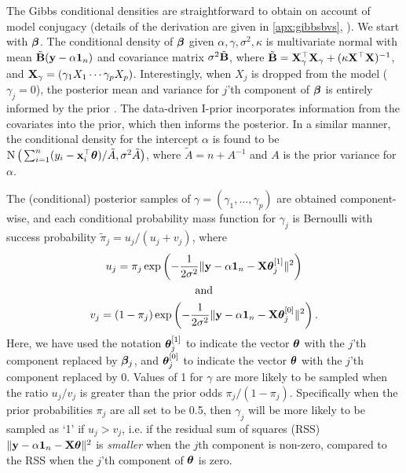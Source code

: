 \documentclass[showframe,11pt,twoside,openright]{report}
\begin{document}
The Gibbs conditional densities are straightforward to obtain on account of model conjugacy (details of the derivation are given in \cref{apx:gibbsbvs}, ).
We start with ${\bm\beta}$. 
The conditional density of ${\bm\beta}$ given $\alpha,\gamma,\sigma^2,\kappa$ is multivariate normal with mean $\tilde {{\mathbf B}}({\mathbf y}-\alpha{\mathbf 1}_n)$ and covariance matrix $\sigma^2\tilde {{\mathbf B}}$, where $\tilde {{\mathbf B}} = {\mathbf X}_\gamma^\top {\mathbf X}_\gamma + (\kappa \mathbf X^\top \mathbf X)^{-1}$, and ${\mathbf X}_\gamma = (\gamma_1X_1 \cdots \gamma_pX_p)$.
Interestingly, when $X_j$ is dropped from the model ($\gamma_j=0$), the posterior mean and variance for $j$'th component of ${\bm\beta}$ is entirely informed by the prior \citep{Kuo1998}.
The data-driven I-prior incorporates information from the covariates into the prior, which then informs the posterior.
In a similar manner, the conditional density for the intercept $\alpha$ is found to be $\operatorname{N}\big( \sum_{i=1}^n(y_i - {\mathbf x}_i^\top{\bm\theta}) / \tilde A,\sigma^2\tilde A \big)$, where $\tilde A = n + A^{-1}$ and $A$ is the prior variance for $\alpha$.

The (conditional) posterior samples of $\gamma=(\gamma_1,\dots,\gamma_p)$ are obtained component-wise, and each conditional probability mass function for $\gamma_j$ is Bernoulli  with success probability $\tilde \pi_j = u_j / (u_j + v_j)$, where
\begin{align*}
  \begin{gathered}
    u_j = \pi_j \exp\left( - \frac{1}{2\sigma^2} \Vert {\mathbf y} - \alpha {\mathbf 1}_n - {\mathbf X}{\bm\theta}_j^{[1]} \Vert^2 \right) \\
    \text{and} \\
    v_j = (1-\pi_j) \exp\left( - \frac{1}{2\sigma^2} \Vert {\mathbf y} - \alpha {\mathbf 1}_n - {\mathbf X}{\bm\theta}_j^{[0]} \Vert^2 \right).
  \end{gathered}
\end{align*}
Here, we have used the notation ${\bm\theta}_j^{[1]}$ to indicate the vector ${\bm\theta}$ with the $j$'th component replaced by ${\bm\beta}_j$, and ${\bm\theta}_j^{[0]}$ to indicate the vector ${\bm\theta}$ with the $j$'th component replaced by 0.
Values of 1 for $\gamma$ are more likely to be sampled when the ratio $u_j / v_j$ is greater than the prior odds $\pi_j/(1-\pi_j)$.
Specifically when the prior probabilities $\pi_j$ are all set to be 0.5, then $\gamma_j$ will be more likely to be sampled as `1' if $u_j > v_j$, i.e. if the residual sum of squares (RSS) $\Vert {\mathbf y} - \alpha{\mathbf 1}_n - {\mathbf X}{\bm\theta} \Vert^2$ is \emph{smaller} when the $j$th component is non-zero, compared to the RSS when the $j$'th component of ${\bm\theta}$ is zero.
\end{document}
